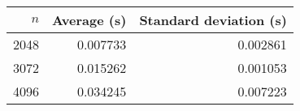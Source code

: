 \begin{tabular}{rrr}
$n$ & Average (s) & Standard deviation (s)\\\hline
2048 & 0.007733 & 0.002861\\
3072 & 0.015262 & 0.001053\\
4096 & 0.034245 & 0.007223\\
\end{tabular}
